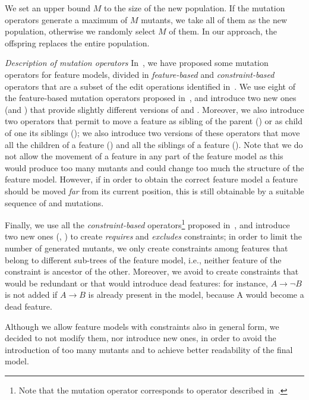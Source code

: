 \begin{tikzborder}{\cite{Gargantini16:validation}}
\begin{tikzborder}{\cite{gargantini_combinatorial_2017}}
\begin{tikzborder}{\cite{gargantini_combinatorial_2017}}
\begin{tikzborder}{\cite{garn2019}}
\begin{tikzborder}{\cite{arcaini2019achieving}}
	\bb We set an upper bound $M$ to the size of the new population. If the mutation operators generate a maximum of $M$ mutants, we take all of them as the new population, otherwise we randomly select $M$ of them. In our approach, the offspring replaces the entire population.
	
	{\it Description of mutation operators}
	In~\cite{icst2015}, we have proposed some mutation operators for feature models, divided in \textit{feature-based} and \textit{constraint-based} operators that are a subset of the edit operations identified in~\cite{Burdek2016}. We use eight of the feature-based mutation operators proposed in~\cite{icst2015}, and introduce two new ones (\OrToAndOpt and \AlToAndOpt) that provide slightly different versions of \OrToAnd and \AlToAnd. Moreover, we also introduce two operators that permit to move a feature as sibling of the parent (\PullUp) or as child of one its siblings (\PushDown); we also introduce two versions of these operators that move all the children of a feature (\PullUpChildren) and all the siblings of a feature (\PushDownSiblings). Note that we do not allow the movement of a feature in any part of the feature model as this would produce too many mutants and could change too much the structure of the feature model. However, if in order to obtain the correct feature model a feature should be moved {\it far} from its current position, this is still obtainable by a suitable sequence of \PullUp and \PushDown mutations.
	
	Finally, we use all the \textit{constraint-based} operators\footnote{Note that the mutation operator \DelConstr corresponds to operator \MC described in~\cite{icst2015}.} proposed in~\cite{icst2015}, and introduce two new ones (\Creq, \Cexc) to create {\it requires} and {\it excludes} constraints; in order to limit the number of generated mutants, we only create constraints among features that belong to different sub-trees of the feature model, i.e., neither feature of the constraint is ancestor of the other. Moreover, we avoid to create constraints that would be redundant or that would introduce dead features: for instance, $A \rightarrow \neg B$ is not added if $A \rightarrow B$ is already present in the model, because A would become a dead feature.
	
	Although we allow feature models with constraints also in general form, we decided to not modify them, nor introduce new ones, in order to avoid the introduction of too many mutants and to achieve better readability of the final model.
	

\end{tikzborder}
\end{tikzborder}
\end{tikzborder}
\end{tikzborder}
\end{tikzborder}
